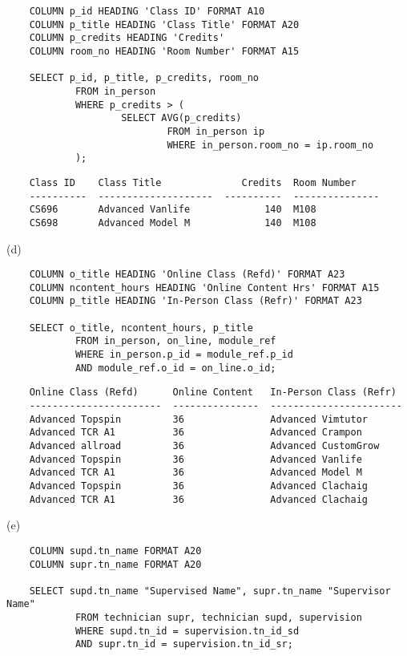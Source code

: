 \documentclass[11pt, english]{article}
\begin{document}
	{\scriptsize\begin{verbatim}
	COLUMN p_id HEADING 'Class ID' FORMAT A10
	COLUMN p_title HEADING 'Class Title' FORMAT A20
	COLUMN p_credits HEADING 'Credits'
	COLUMN room_no HEADING 'Room Number' FORMAT A15

	SELECT p_id, p_title, p_credits, room_no
        	FROM in_person
        	WHERE p_credits > (
        	        SELECT AVG(p_credits)
        	                FROM in_person ip
        	                WHERE in_person.room_no = ip.room_no
        	);
	\end{verbatim}}

	{\scriptsize\begin{verbatim}
	Class ID    Class Title              Credits  Room Number
	----------  --------------------  ----------  ---------------
	CS696       Advanced Vanlife             140  M108
	CS698       Advanced Model M             140  M108
	\end{verbatim}}
	
	(d)

	{\scriptsize\begin{verbatim}
	COLUMN o_title HEADING 'Online Class (Refd)' FORMAT A23
	COLUMN ncontent_hours HEADING 'Online Content Hrs' FORMAT A15
	COLUMN p_title HEADING 'In-Person Class (Refr)' FORMAT A23

	SELECT o_title, ncontent_hours, p_title
	        FROM in_person, on_line, module_ref
	        WHERE in_person.p_id = module_ref.p_id
	        AND module_ref.o_id = on_line.o_id;
	\end{verbatim}}

	{\scriptsize\begin{verbatim}
	Online Class (Refd)      Online Content   In-Person Class (Refr)
	-----------------------  ---------------  -----------------------
	Advanced Topspin         36               Advanced Vimtutor
	Advanced TCR A1          36               Advanced Crampon
	Advanced allroad         36               Advanced CustomGrow
	Advanced Topspin         36               Advanced Vanlife
	Advanced TCR A1          36               Advanced Model M
	Advanced Topspin         36               Advanced Clachaig
	Advanced TCR A1          36               Advanced Clachaig
	\end{verbatim}}
	
	(e)

	{\scriptsize\begin{verbatim}
	COLUMN supd.tn_name FORMAT A20
	COLUMN supr.tn_name FORMAT A20

	SELECT supd.tn_name "Supervised Name", supr.tn_name "Supervisor Name"
        	FROM technician supr, technician supd, supervision
        	WHERE supd.tn_id = supervision.tn_id_sd
        	AND supr.tn_id = supervision.tn_id_sr;
	\end{verbatim}}
\end{document}
